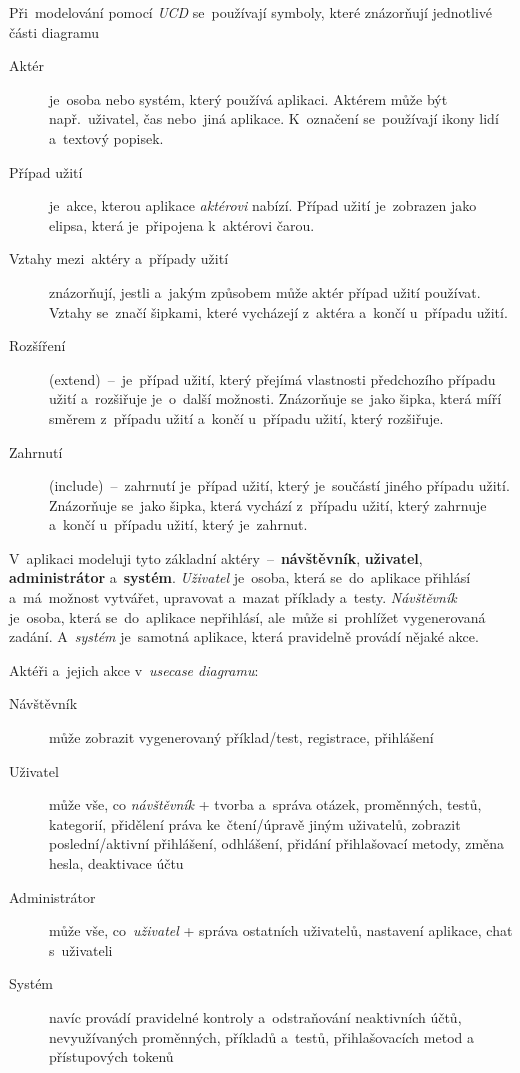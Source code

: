 \documentclass[11pt,a4paper]{report}
\begin{document}
                Při~modelování pomocí \emph{UCD} se~používají symboly, které znázorňují jednotlivé části diagramu
                \begin{description}
                    \item[Aktér] je~osoba nebo systém, který používá aplikaci. Aktérem může být např.~uživatel, čas nebo~jiná aplikace. K~označení se~používají ikony lidí a~textový popisek.
                    \item[Případ užití] je~akce, kterou aplikace \emph{aktérovi} nabízí. Případ užití je~zobrazen jako elipsa, která je~připojena k~aktérovi čarou.
                    \item[Vztahy mezi~aktéry a~případy užití] znázorňují, jestli a~jakým způsobem může aktér případ užití používat. Vztahy se~značí šipkami, které vycházejí z~aktéra a~končí u~případu užití.
                    \item[Rozšíření] (extend)~--~je~případ užití, který přejímá vlastnosti předchozího případu užití a~rozšiřuje je~o~další možnosti. Znázorňuje se~jako šipka, která míří směrem z~případu užití a~končí u~případu užití, který rozšiřuje.
                    \item[Zahrnutí] (include)~--~zahrnutí je~případ užití, který je~součástí jiného případu užití. Znázorňuje se~jako šipka, která vychází z~případu užití, který zahrnuje a~končí u~případu užití, který je~zahrnut.
                \end{description}

                V~aplikaci modeluji tyto základní aktéry~--~\textbf{návštěvník}, \textbf{uživatel}, \textbf{administrátor} a~\textbf{systém}. \emph{Uživatel} je~osoba, která se~do~aplikace přihlásí a~má~možnost vytvářet, upravovat a~mazat příklady a~testy. \emph{Návštěvník} je~osoba, která se~do~aplikace nepřihlásí, ale~může si~prohlížet vygenerovaná zadání. A~\emph{systém} je~samotná aplikace, která pravidelně provádí nějaké akce.

                Aktéři a~jejich akce v~\emph{usecase diagramu}:

                \begin{description}
                    \item[Návštěvník] může zobrazit vygenerovaný příklad/test, registrace, přihlášení
                    \item[Uživatel] může vše, co \emph{návštěvník} + tvorba a~správa otázek, proměnných, testů, kategorií, přidělení práva ke~čtení/úpravě jiným uživatelů, zobrazit poslední/aktivní přihlášení, odhlášení, přidání přihlašovací metody, změna hesla, deaktivace účtu
                    \item[Administrátor] může vše, co~\emph{uživatel} + správa ostatních uživatelů, nastavení aplikace, chat s~uživateli
                    \item[Systém] navíc provádí pravidelné kontroly a~odstraňování neaktivních účtů, nevyužívaných proměnných, příkladů a~testů, přihlašovacích metod a přístupových tokenů
                \end{description}
\end{document}
